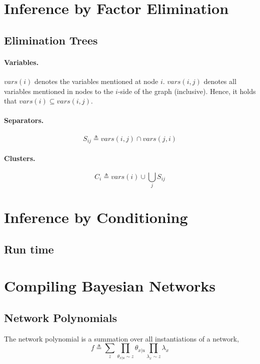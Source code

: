 \documentclass[11pt]{article}
\begin{document}
\section{Inference by Factor Elimination}
\subsection{Elimination Trees}
\paragraph{Variables.}
$vars(i)$ denotes the variables mentioned at node $i$. $vars(i, j)$ denotes all variables mentioned in nodes to the $i$-side of the graph (inclusive). Hence, it holds that $vars(i) \subseteq vars(i, j)$.

\paragraph{Separators.} 
\begin{equation}
	S_{ij} \triangleq vars(i, j) \cap vars(j, i)
\end{equation}

\paragraph{Clusters.} 
\begin{equation}
	C_i \triangleq vars(i) \cup \bigcup_j S_{ij}
\end{equation}

\section{Inference by Conditioning}
\subsection{Run time}




\section{Compiling Bayesian Networks}
\subsection{Network Polynomials}
The network polynomial is a summation over all instantiations of a network, 
\begin{equation}
	f \triangleq \sum_z \prod_{\theta_{x | u} \sim z }\theta _{x | u} \prod _{\lambda _x \sim z} \lambda_x
\end{equation}
\end{document}

